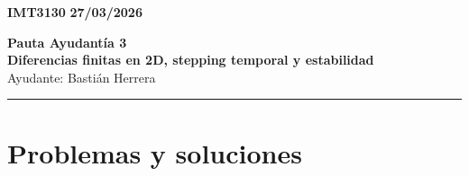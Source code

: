 \documentclass[11pt]{article}
\begin{document}
    \begin{flushleft}
        \small
        \vspace{1pt}
        \textbf{IMT3130} \hfill
        \textbf{27/03/2026}
    \end{flushleft}
    \begin{center}
        \LARGE\textbf{Pauta Ayudantía 3}\\
        \vspace{3pt}
        \normalsize\textbf{Diferencias finitas en 2D, stepping temporal y estabilidad}\\
        \normalsize Ayudante: Bastián Herrera 
        \rule{\textwidth}{0.05mm}
    \end{center}

\section*{Problemas y soluciones}
\end{document}
